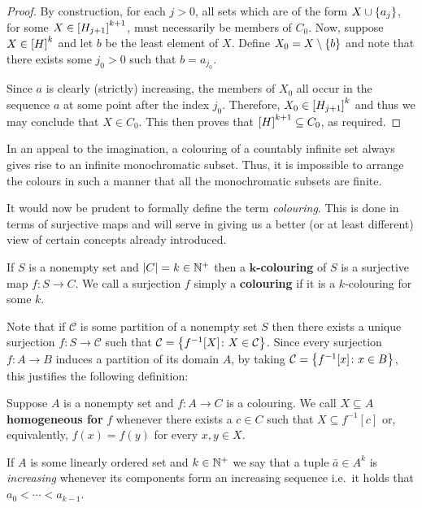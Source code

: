 \begin{proof}
	By construction, for each $j>0$, all sets which are of the form
	$X\cup\set{a_j}$, for some $X\in\subsets{k+1}{H_{j+1}}$, must necessarily be
	members of $C_0$.  Now, suppose $X\in\subsets{k}{H}$ and let $b$ be the
	least element of $X$.  Define $X_0=X\setminus\set{b}$ and note that there
	exists some $j_0>0$ such that $b=a_{j_0}$.

	Since $a$ is clearly (strictly) increasing, the members of $X_0$ all occur
	in the sequence $a$ at some point after the index $j_0$. Therefore,
	$X_0\in\subsets{k}{H_{j+1}}$ and thus we may conclude that $X\in C_0$.  This
	then proves that $\subsets{k+1}{H}\subseteq C_0$, as required.
\end{proof}

In an appeal to the imagination, a colouring of a countably infinite set always
gives rise to an infinite monochromatic subset.  Thus, it is impossible to
arrange the colours in such a manner that all the monochromatic subsets are
finite.

It would now be prudent to formally define the term \textit{colouring}.  This is
done in terms of surjective maps and will serve in giving us a better (or at
least different) view of certain concepts already introduced.

\begin{dfn}[Colouring]\label{def:Col}
	If $S$ is a nonempty set and $\card{C}=k\in\posnats$ then a
	$\mathbf{k}$\textbf{-colouring} of $S$ is a surjective map $f\colon  S\to
	C$.  We call a surjection $f$ simply a \textbf{colouring} if it is a
	$k$-colouring for some $k$.
\end{dfn}

Note that if $\mathcal{C}$ is some partition of a nonempty set $S$ then there
exists a unique surjection $f\colon S\to \mathcal{C}$ such that
$\mathcal{C}=\setbuild{f^{-1}[X]}{X\in \mathcal{C}}$. Since every surjection
$f\colon A\to B$ induces a partition of its domain $A$, by taking
$\mathcal{C}=\setbuild{f^{-1}[x]}{x\in B}$, this justifies the following
definition:

\begin{dfn}
	Suppose $A$ is a nonempty set and $f\colon A\to C$ is a colouring.  We call
	$X\subseteq A$ \textbf{homogeneous for} $f$ whenever there exists a $c\in
	C$ such that $X\subseteq f^{-1}[c]$ or, equivalently, $f(x)=f(y)$ for every
	$x,y\in X$.
\end{dfn}

If $A$ is some linearly ordered set and $k\in\posnats$ we say that a tuple
$\bar{a}\in A^k$ is \textit{increasing} whenever its components form an
increasing sequence i.e.\ it holds that $a_0<\dotsb<a_{k-1}$.

